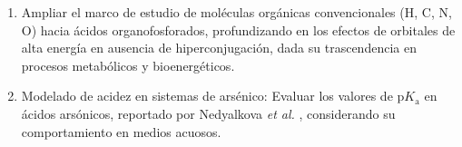 \documentclass[12pt]{article}
\begin{document}
\begin{enumerate}
		
		
		
		
		\item 
		Ampliar el marco de estudio de mol\'{e}culas org\'{a}nicas convencionales (H, C, N, O) hacia \'{a}cidos organofosforados, profundizando en los efectos de orbitales de alta energ\'{i}a en ausencia de hiperconjugaci\'{o}n, dada su trascendencia en procesos metab\'{o}licos y bioenerg\'{e}ticos.
		
		\item Modelado de acidez en sistemas de ars\'{e}nico: Evaluar los valores de $\mathrm{p}K_{\mathrm{a}}$ en \'{a}cidos ars\'{o}nicos, 
		reportado por Nedyalkova \textit{et al.} \cite{Nedyalkova2025}, considerando su comportamiento en medios acuosos. 
		
		
		
		
	\end{enumerate}
	
\end{document}
